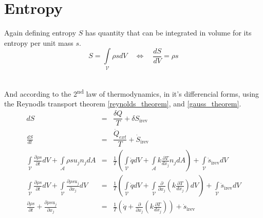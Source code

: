 \section{Entropy}
Again defining entropy $S$ has quantity that can be integrated in volume for its entropy per unit mass $s$.
\begin{equation}
    S=\int\limits_{\mathcal{V}}\rho s dV \quad  \Leftrightarrow \quad  \frac{dS}{dV}= \rho s
\end{equation}\

And according to the 2\textsuperscript{nd} law of thermodynamics, in it's differencial forms, using the Reynodls transport theorem \eqref{reynolds_theorem}, and \eqref{gauss_theorem}.
\begin{eqnarray}
    \label{differential_entropy}
    dS &=& \dfrac{\delta Q}{T} + \delta S_{\text{irev}}\\
    \frac{dS}{dt} &=& \dfrac{\dot{Q}_{ext}}{T} + \dot{S}_{\text{irev}}\\
    \int\limits_{\mathcal{V}} \frac{\partial \rho s}{\partial t} dV +
    \int\limits_{\mathcal{A}} \rho s u_j n_j dA &=&
    \frac{1}{T}\left(\int\limits_{\mathcal{V}} \dot{q} dV + \int\limits_{\mathcal{A}} k\frac{\partial T}{d x_j} n_j dA \right) + \int\limits_{\mathcal{V}} \dot{s}_{\text{irev}} dV\\
    \int\limits_{\mathcal{V}} \frac{\partial \rho s}{\partial t} dV +
    \int\limits_{\mathcal{V}} \frac{\partial \rho s u_j}{\partial x_j} dV &=& \frac{1}{T}\left(\int\limits_{\mathcal{V}} \dot{q} dV + \int\limits_{\mathcal{V}} \frac{\partial} {\partial x_j} \left( k\frac{\partial T}{d x_j} \right) dV \right) + \int\limits_{\mathcal{V}} \dot{s}_{\text{irev}} dV \\
    \frac{\partial \rho s}{\partial t} +  \frac{\partial \rho s u_j}{\partial x_j} &=& \frac{1}{T}\left(\dot{q} + \frac{\partial} {\partial x_j} \left( k\frac{\partial T}{d x_j} \right) \right) + \dot{s}_{\text{irev}}
\end{eqnarray}







